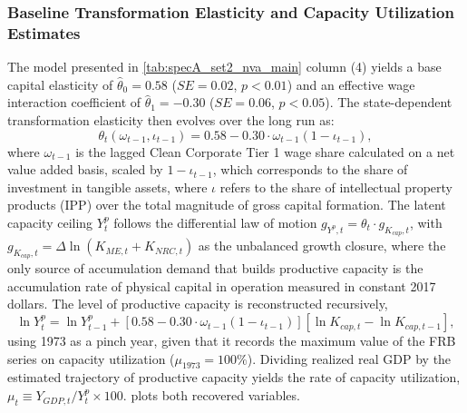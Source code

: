 


\subsubsection{Baseline Transformation Elasticity and Capacity Utilization Estimates}
\label{sec:42:baseline_capacity}

The model presented in \cref{tab:specA_set2_nva_main} column (4) yields a base capital
elasticity of $\hat{\theta}_0 = 0.58$ ($SE = 0.02$, $p < 0.01$)
and an effective wage interaction coefficient of
$\hat{\theta}_1 = -0.30$ ($SE = 0.06$, $p < 0.05$). The
state-dependent transformation elasticity then evolves over the long run as: 
\begin{equation}
	\theta_t(\omega_{t-1}, \iota_{t-1})
	= 0.58 - 0.30 \cdot \omega_{t-1}(1 - \iota_{t-1}),
	\label{eq:42:theta_state}
\end{equation}
where $\omega_{t-1}$ is the lagged Clean Corporate Tier 1 wage share calculated on a net value added basis, scaled by $1-\iota_{t-1}$, which corresponds to the share of investment in tangible assets, where $\iota$ refers to the share of intellectual property products (IPP) over the total magnitude of gross capital formation. The latent capacity ceiling $Y_t^p$ follows the differential law of motion $g_{Y^p,t} = \theta_t \cdot g_{K_{cap},t}$, with $g_{K_{cap},t} = \Delta \ln(K_{ME,t} + K_{NRC,t})$ as the unbalanced growth closure, where the only source of accumulation demand that builds productive capacity is the accumulation rate of physical capital in operation measured in constant 2017 dollars. The level of productive capacity is reconstructed recursively,
\begin{equation}
	\ln Y_t^p = \ln Y_{t-1}^p
	+ \left[ 0.58 - 0.30 \cdot \omega_{t-1}(1 - \iota_{t-1}) \right]
	\left[ \ln K_{cap,t} - \ln K_{cap,t-1} \right],
	\label{eq:42:yp_recursion}
\end{equation}
using 1973 as a pinch year, given that it records the maximum value of the FRB series on capacity utilization ($\mu_{1973} = 100\%$). Dividing realized real GDP by the estimated trajectory of productive capacity yields the rate of capacity utilization, $\mu_t \equiv Y_{GDP,t}/Y_t^p \times 100$.  plots both recovered variables. 

